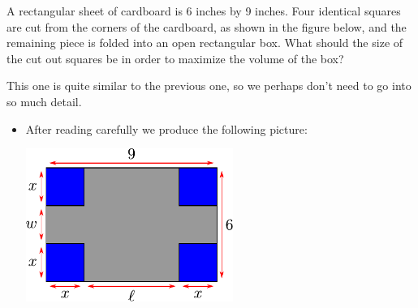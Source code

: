 \begin{eg}\label{APPglobalMaxMinC}
A rectangular sheet of cardboard is 6 inches by 9 inches. Four
identical squares are cut from the corners of the cardboard, as shown in
the figure below, and the remaining piece is folded into an open
rectangular box. What should the size of the cut out squares be in
order to maximize the volume of the box?

\soln This one is quite similar to the previous one, so we perhaps don't need to go into
so much detail.
\begin{itemize}
 \item After reading carefully we produce the following picture:
\begin{efig}
\begin{center}
   \includegraphics[height=5cm]{extra/box_vol}
\end{center}
\end{efig}


\end{itemize}
\end{eg}
